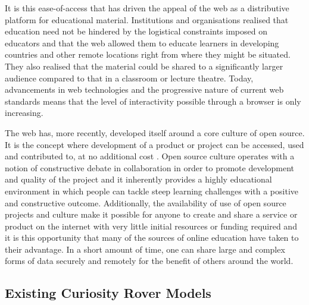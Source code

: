       It is this ease-of-access that has driven the appeal of the web as a distributive platform for educational material. Institutions and organisations realised that education need not be hindered by the logistical constraints imposed on educators and that the web allowed them to educate learners in developing countries and other remote locations right from where they might be situated. They also realised that the material could be shared to a significantly larger audience compared to that in a classroom or lecture theatre. Today, advancements in web technologies and the progressive nature of current web standards means that the level of interactivity possible through a browser is only increasing.
      
      The web has, more recently, developed itself around a core culture of open source. It is the concept where development of a product or project can be accessed, used and contributed to, at no additional cost \cite{2_monago_2014}. Open source culture operates with a notion of constructive debate in collaboration in order to promote development and quality of the project and it inherently provides a highly educational environment in which people can tackle steep learning challenges with a positive and constructive outcome. Additionally, the availability of use of open source projects and culture make it possible for anyone to create and share a service or product on the internet with very little initial resources or funding required and it is this opportunity that many of the sources of online education have taken to their advantage. In a short amount of time, one can share large and complex forms of data securely and remotely for the benefit of others around the world.
    
    \subsection{Existing Curiosity Rover Models}